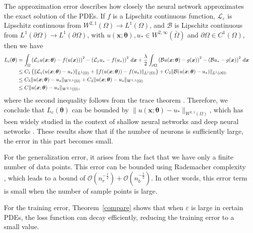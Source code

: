 The approximation error describes how closely the neural network approximates the exact solution of the PDEs. If \( f \) is a Lipschitz continuous function, \( \mathcal{L}_\varepsilon \) is Lipschitz continuous from \( W^{2,1}(\Omega) \to L^1(\Omega) \), and \( \mathcal{B} \) is Lipschitz continuous from \( L^1(\partial\Omega) \to L^1(\partial\Omega) \), with \( u(\boldsymbol{x}; \boldsymbol{\theta}), u_* \in W^{2,\infty}(\bar{\Omega}) \) and \( \partial \Omega \in C^1(\Omega) \), then we have
\begin{align}
    L_c(\boldsymbol{\theta}) &= \int_\Omega \left( \mathcal{L}_\varepsilon u(\boldsymbol{x}; \boldsymbol{\theta}) - f(u(\boldsymbol{x})) \right)^2 - \left( \mathcal{L}_\varepsilon u_* - f(u_*) \right)^2 \, d\boldsymbol{x} + \frac{\lambda}{2} \int_{\partial\Omega} \left( \mathcal{B} u(\boldsymbol{x}; \boldsymbol{\theta}) - g(\boldsymbol{x}) \right)^2 - \left( \mathcal{B} u_* - g(\boldsymbol{x}) \right)^2 \, d\boldsymbol{x} \notag\\&\leq C_1 \left( \|\mathcal{L}_\varepsilon (u(\boldsymbol{x}; \boldsymbol{\theta}) - u_*)\|_{L^1(\Omega)} + \|f( u(\boldsymbol{x}; \boldsymbol{\theta})) - f(u_*)\|_{L^1(\Omega)} \right)  + C_2 \|\mathcal{B} (u(\boldsymbol{x}; \boldsymbol{\theta}) - u_*)\|_{L^1(\partial\Omega)} \notag \\
    &\leq C_3 \|u(\boldsymbol{x}; \boldsymbol{\theta}) - u_*\|_{W^{2,1}(\Omega)} + C_4 \|u(\boldsymbol{x}; \boldsymbol{\theta}) - u_*\|_{W^{1,1}(\Omega)} \notag \\
    &\leq C \|u(\boldsymbol{x}; \boldsymbol{\theta}) - u_*\|_{W^{2,1}(\Omega)},
\end{align}
where the second inequality follows from the trace theorem \cite{evans2022partial}. Therefore, we conclude that \( L_c(\boldsymbol{\theta}) \) can be bounded by \( \|u(\boldsymbol{x}; \boldsymbol{\theta}) - u_*\|_{W^{2,1}(\Omega)} \), which has been widely studied in the context of shallow neural networks \cite{siegel2020approximation} and deep neural networks \cite{yang2023nearly1}. These results show that if the number of neurons is sufficiently large, the error in this part becomes small.

For the generalization error, it arises from the fact that we have only a finite number of data points. This error can be bounded using Rademacher complexity \cite{yang2023nearly1,luo2020two}, which leads to a bound of \( \mathcal{O}\left(n_r^{-\frac{1}{2}}\right) + \mathcal{O}\left(n_b^{-\frac{1}{2}}\right) \). In other words, this error term is small when the number of sample points is large.

For the training error, Theorem~\ref{compare} shows that when \( \varepsilon \) is large in certain PDEs, the loss function can decay efficiently, reducing the training error to a small value.

